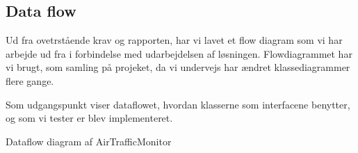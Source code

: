 

\subsection{Data flow}
Ud fra ovetrstående krav og rapporten, har vi lavet et flow diagram som vi har arbejde ud fra i forbindelse med udarbejdelsen af løsningen. 
Flowdiagrammet har vi brugt, som samling på projeket, da vi undervejs har ændret klassediagrammer flere gange. 

Som udgangspunkt viser dataflowet, hvordan klasserne som interfacene benytter, og som vi tester er blev implementeret.

 {Dataflow diagram af AirTrafficMonitor}